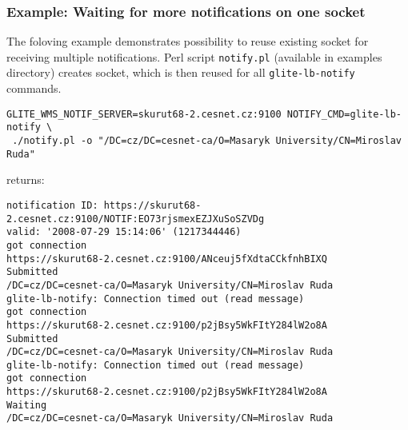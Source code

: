 \subsubsection{Example: Waiting for more notifications on one socket}

The foloving example demonstrates possibility to reuse existing socket for receiving
multiple notifications. Perl script \verb'notify.pl' (available in 
examples directory) creates socket, which is then reused for all
\verb'glite-lb-notify' commands.

\begin{verbatim}
GLITE_WMS_NOTIF_SERVER=skurut68-2.cesnet.cz:9100 NOTIFY_CMD=glite-lb-notify \
 ./notify.pl -o "/DC=cz/DC=cesnet-ca/O=Masaryk University/CN=Miroslav Ruda"
\end{verbatim}

returns:

\begin{verbatim}
notification ID: https://skurut68-2.cesnet.cz:9100/NOTIF:EO73rjsmexEZJXuSoSZVDg
valid: '2008-07-29 15:14:06' (1217344446)
got connection
https://skurut68-2.cesnet.cz:9100/ANceuj5fXdtaCCkfnhBIXQ        Submitted
/DC=cz/DC=cesnet-ca/O=Masaryk University/CN=Miroslav Ruda
glite-lb-notify: Connection timed out (read message)
got connection
https://skurut68-2.cesnet.cz:9100/p2jBsy5WkFItY284lW2o8A        Submitted
/DC=cz/DC=cesnet-ca/O=Masaryk University/CN=Miroslav Ruda
glite-lb-notify: Connection timed out (read message)
got connection
https://skurut68-2.cesnet.cz:9100/p2jBsy5WkFItY284lW2o8A        Waiting
/DC=cz/DC=cesnet-ca/O=Masaryk University/CN=Miroslav Ruda
\end{verbatim}
